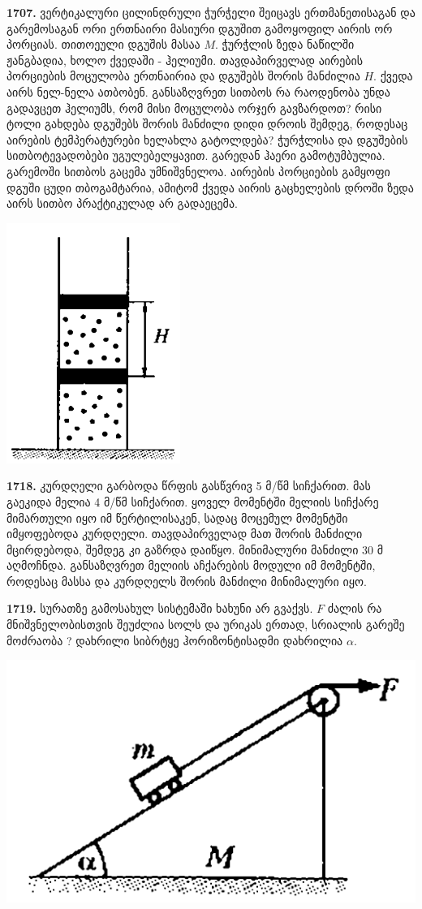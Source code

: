 \documentclass[12pt,a4paper,]{report}
\begin{document}
\textbf{1707.} ვერტიკალური ცილინდრული ჭურჭელი შეიცავს ერთმანეთისაგან და გარემოსაგან ორი ერთნაირი მასიური დგუშით გამოყოფილ აირის ორ პორციას. თითოეული დგუშის მასაა $M$. ჭურჭლის ზედა ნაწილში ჟანგბადია, ხოლო ქვედაში - ჰელიუმი. თავდაპირველად აირების პორციების მოცულობა ერთნაირია და დგუშებს შორის მანძილია  $H$. ქვედა აირს ნელ-ნელა ათბობენ. განსაზღვრეთ სითბოს რა რაოდენობა უნდა გადავცეთ ჰელიუმს, რომ მისი მოცულობა ორჯერ გავზარდოთ? რისი ტოლი გახდება დგუშებს შორის მანძილი დიდი დროის შემდეგ, როდესაც აირების ტემპერატურები ხელახლა გატოლდება? ჭურჭლისა და დგუშების სითბოტევადობები უგულებელყავით. გარედან ჰაერი გამოტუმბულია. გარემოში სითბოს გაცემა უმნიშვნელოა. აირების პორციების გამყოფი დგუში ცუდი თბოგამტარია, ამიტომ ქვედა აირის გაცხელების დროში ზედა აირს სითბო პრაქტიკულად არ გადაეცემა.
		\begin{center}
			\includegraphics[scale=0.5]{images/F1707.png}
		\end{center}
	
\textbf{1718.} კურდღელი გარბოდა წრფის გასწვრივ 5 მ/წმ სიჩქარით. მას გაეკიდა მელია 4 მ/წმ სიჩქარით. ყოველ მომენტში მელიის სიჩქარე მიმართული იყო იმ წერტილისაკენ, სადაც მოცემულ მომენტში იმყოფებოდა კურდღელი. თავდაპირველად მათ შორის მანძილი მცირდებოდა, შემდეგ კი გაზრდა დაიწყო. მინიმალური მანძილი 30 მ აღმოჩნდა. განსაზღვრეთ მელიის აჩქარების მოდული იმ მომენტში, როდესაც მასსა და კურდღელს შორის მანძილი მინიმალური იყო.

\textbf{1719.} სურათზე გამოსახულ სისტემაში ხახუნი არ გვაქვს. $F$ ძალის რა მნიშვნელობისთვის შეუძლია სოლს და ურიკას ერთად, სრიალის გარეშე მოძრაობა ? დახრილი სიბრტყე ჰორიზონტისადმი დახრილია $\alpha$.
		\begin{center}
			\includegraphics[scale=0.3]{images/1719.png}
		\end{center}
\end{document}
